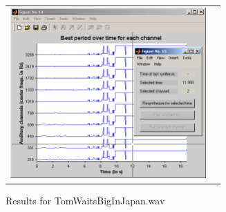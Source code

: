 \begin{figure}[p]
\begin{tabular}{cc}
        \includegraphics[width=7.5cm]{Graphics/MECDemoTomWaitsBigInJapanUI} & \\
    \end{tabular}
    \caption{Results for TomWaitsBigInJapan.wav}
    \label{Fig:MECTomWaitsExample}
\end{figure}

